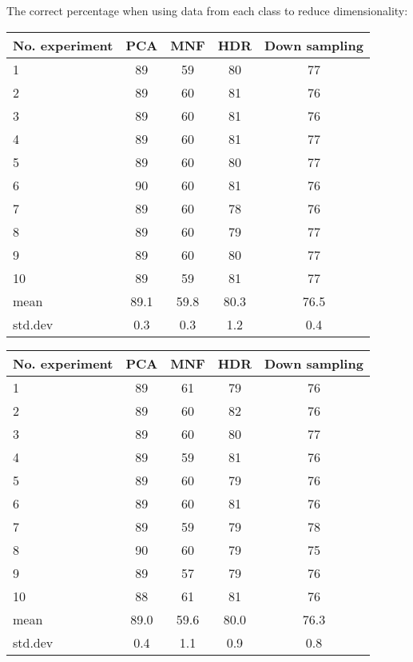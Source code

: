 \documentclass{article}
\begin{document}
The correct percentage when using data from each class to reduce dimensionality:
\begin{table*}[h!]
\begin{minipage}{.4\linewidth}
\centering
\begin{tabular}{lcccc}
\hline
No. experiment & PCA & MNF & HDR & Down sampling\\
\hline
1 &  89 &  59 & 80 & 77 \\
2 &  89 &  60 & 81 & 76 \\
3 &  89 &  60 & 81 & 76 \\
4 &  89 &  60 & 81 & 77 \\
5 &  89 &  60 & 80 & 77 \\
6 &  90 &  60 & 81 & 76 \\
7 &  89 &  60 & 78 & 76 \\
8 &  89 &  60 & 79 & 77 \\
9 &  89 &  60 & 80 & 77 \\
10 &  89 &  59 & 81 & 77 \\
\hline
mean & 89.1 & 59.8 & 80.3 & 76.5 \\
std.dev & 0.3 & 0.3 & 1.2 & 0.4\\
\hline
\end{tabular}
\caption{Table of training correct percentages when reduce dimensionality for each class}
\end{minipage}
\qquad
\qquad
\qquad
\qquad
\begin{minipage}{.4\linewidth}
\centering
\begin{tabular}{lcccc}
\hline
No. experiment & PCA & MNF & HDR & Down sampling\\
\hline
1 &  89 &  61 & 79 & 76 \\
2 &  89 &  60 & 82 & 76 \\
3 &  89 &  60 & 80 & 77 \\
4 &  89 &  59 & 81 & 76 \\
5 &  89 &  60 & 79 & 76 \\
6 &  89 &  60 & 81 & 76 \\
7 &  89 &  59 & 79 & 78 \\
8 &  90 &  60 & 79 & 75 \\
9 &  89 &  57 & 79 & 76 \\
10 &  88 & 61 & 81 & 76 \\
\hline
mean & 89.0 & 59.6 & 80.0 & 76.3 \\
std.dev & 0.4 & 1.1 & 0.9 & 0.8\\
\hline
\end{tabular}
\caption{Table of test correct percentages when reduce dimensionality for each class}
\end{minipage}
\label{tab: t2}
\end{table*}
\end{document}
